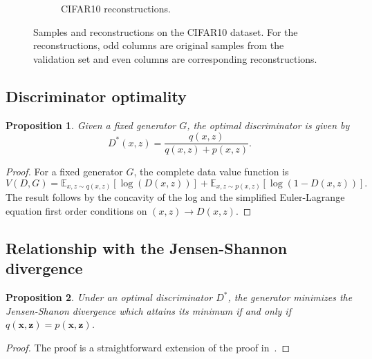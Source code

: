 \documentclass{article}
\newtheorem{prop}{Proposition}
\newcommand{\EE}{\mathbb{E}}
\begin{document}
\begin{figure}[p]
\begin{subfigure}[t]{0.49\textwidth}
        \caption{\label{fig:cifar10_reconstructions} CIFAR10
          reconstructions.}
    \end{subfigure}
    \caption{\label{fig:cifar10_images} Samples and reconstructions on the
        CIFAR10 dataset. For the reconstructions, odd columns are
        original samples from the validation set and even columns are
        corresponding reconstructions.}
\end{figure}

\subsection{Discriminator optimality}
\label{sec:disc_opt}
\begin{prop}
    Given a fixed generator $G$, the optimal discriminator is given by
    \begin{equation}
    \label{eq:optgansol}
		D^*(x, z) = \frac{q(x, z)}{q(x, z) + p(x, z)}.
    \end{equation}
\end{prop}
\begin{proof}
	For a fixed generator $G$, the complete data value function is
	\begin{equation}
	\label{eq:cdganvalue}
		V(D, G) = \EE_{x,z \sim q(x,z)}[\log(D(x, z))]
		        + \EE_{x, z \sim p(x, z)}[\log(1 - D(x, z))].
	\end{equation}
	The result follows by the concavity of the log and the simplified
	Euler-Lagrange equation first order conditions on
	$(x, z) \rightarrow D(x, z)$.
\end{proof}

\subsection{Relationship with the Jensen-Shannon divergence}
\label{sec:jsd_rel}
\begin{prop}
	Under an optimal discriminator $D^{*}$, the generator minimizes the
	Jensen-Shanon divergence which attains its minimum if and only if
	$q(\bm{x}, \bm{z}) = p(\bm{x}, \bm{z})$.
\end{prop}
\begin{proof}
	The proof is a straightforward extension of the proof
	in~\cite{goodfellow2014generative}.
\end{proof}
\end{document}
